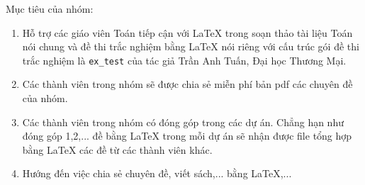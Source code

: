 \documentclass[12pt,a4paper,oneside]{book}
\theoremstyle{nonumberplain}
\numberwithin{equation}{section}
\begin{document}
	\noindent Mục tiêu của nhóm: 
	\begin{enumerate}
		\item Hỗ trợ các giáo viên Toán tiếp cận với \LaTeX{} trong soạn thảo tài liệu Toán nói chung và đề thi trắc nghiệm bằng \LaTeX{} nói riêng với cấu trúc gói đề thi trắc nghiệm là \texttt{ex\_test} của tác giả Trần Anh Tuấn, Đại học Thương Mại.
		\item Các thành viên trong nhóm sẽ được chia sẻ miễn phí bản pdf  các chuyên đề của nhóm.
		\item Các thành viên trong nhóm có đóng góp trong các dự án. Chẳng hạn như đóng góp 1,2,... đề bằng \LaTeX{} trong mỗi dự án sẽ nhận được file tổng hợp bằng \LaTeX{} các đề từ các thành viên khác.
		\item Hướng đến việc chia sẻ chuyên đề, viết sách,... bằng \LaTeX,...
	\end{enumerate}
\newpage
\newpage
\newpage
\newpage
\newpage
\newpage
\newpage
\newpage
\newpage
\newpage
\newpage
\newpage
\newpage
\newpage
\newpage
\newpage
\newpage
\newpage
\newpage
\newpage
\newpage
\newpage
\newpage
\newpage
\newpage
\newpage
\newpage
\newpage
\newpage
\end{document}
